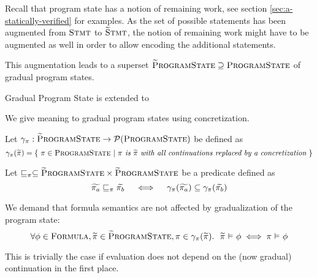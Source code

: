 Recall that program state has a notion of remaining work, see section \ref{sec:a-statically-verified} for examples.
As the set of possible statements has been augmented from $\textup{\textsc{Stmt}}$ to $\textup{\textsc{\ensuremath{\widetilde{\text{S}}}tmt}}$, the notion of remaining work might have to be augmented as well in order to allow encoding the additional statements.

This augmentation leads to a superset $\textup{\textsc{\ensuremath{\widetilde{\text{P}}}rogramState}} \supseteq \textup{\textsc{ProgramState}}$ of gradual program states.
\begin{example}{Gradual Program State}
is extended to
\end{example}

We give meaning to gradual program states using concretization.
\begin{definition}
    Let $\gamma_{\pi} : \textup{\textsc{\ensuremath{\widetilde{\text{P}}}rogramState}} \rightarrow \mathcal{P}(\textup{\textsc{ProgramState}})$ be defined as
    \begin{displaymath}
    \gamma_{\pi}(\widetilde{\pi}) = \{~ \pi \in \textup{\textsc{ProgramState}} ~|~ \textit{$\pi$ is $\widetilde{\pi}$ with all continuations replaced by a concretization} ~\}
    \end{displaymath} 
\end{definition}
\begin{definition}
    Let $\sqsubseteq_{\pi} \subseteq \textup{\textsc{\ensuremath{\widetilde{\text{P}}}rogramState}} \times \textup{\textsc{\ensuremath{\widetilde{\text{P}}}rogramState}}$ be a predicate defined as
    $$\widetilde{\pi_a} \sqsubseteq_{\pi} \widetilde{\pi_b}  \quad\iff\quad  \gamma_{\pi}(\widetilde{\pi_a}) \subseteq \gamma_{\pi}(\widetilde{\pi_b})$$
\end{definition}

\begin{comment}
Consequence:
\begin{displaymath}
\forall \grad{\pi_{\grad{s}}} \in \setGProgramState_{\grad{s}}, \pi \in \gamma_{\pi}(\grad{\pi_{\grad{s}}}).~ \exists s \in \gamma_s(\grad{s}).~ \pi \in \setProgramState_s
\end{displaymath}
\end{comment}

\begin{lemma}
    \label{lemma:gradPS-form-sem}
    We demand that formula semantics are not affected by gradualization of the program state:
    \begin{displaymath}
    \forall \phi \in \textup{\textsc{Formula}}, \widetilde{\pi} \in \textup{\textsc{\ensuremath{\widetilde{\text{P}}}rogramState}}, \pi \in \gamma_{\pi}(\widetilde{\pi}).~~ \widetilde{\pi} \,\,{\vDash}\,\, \phi \iff \pi \,\,{\vDash}\,\, \phi
    \end{displaymath}
    
    This is trivially the case if evaluation does not depend on the (now gradual) continuation in the first place.
\end{lemma}

